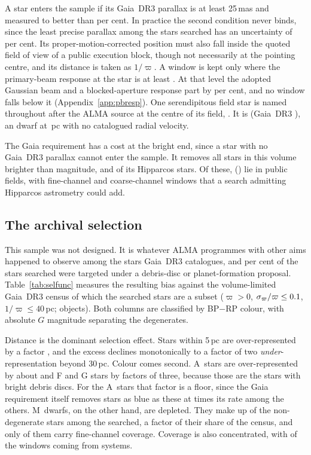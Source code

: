 A star enters the sample if its Gaia~DR3 parallax is at least 25\,mas and
measured to better than \PlxAdqlPct{} per cent. In practice the second
condition never binds, since the least precise parallax among the stars
searched has an uncertainty of \SfPlxWorstPct{} per cent.
Its proper-motion-corrected position must also fall inside the quoted field
of view of a public execution block, though not necessarily at the pointing
centre, and its distance is taken as $1/\varpi$. A window is kept only where
the primary-beam response at the star is at least \BmFloorResp. At that level
the adopted Gaussian beam and a blocked-aperture response part by
\BmFloorTolPct{} per cent, and no window falls below it
(Appendix~\ref{app:pbresp}). One serendipitous field star is named throughout
after the ALMA source at the centre of its field, \BkAlmaName. It is
\BkAlmaTwoMass{} (Gaia~DR3 \BkAlmaGaia), an \BkAlmaSpType{} dwarf at
\BkAlmaDistPc\,pc with no catalogued radial velocity.

The Gaia requirement has a cost at the bright end, since a star with no
Gaia~DR3 parallax cannot enter the sample. It removes all \BsNBright{} stars
in this volume brighter than \BsBrightMag{} magnitude, and \BsNGap{} of its
\BsNVol{} Hipparcos stars. Of these, \BsNAlmaWord{} (\BsStarList) lie in
public fields, with \BsNWinA{} fine-channel and \BsNWinB{} coarse-channel
windows that a search admitting Hipparcos astrometry could add.


\subsection{The archival selection}
\label{sec:bias}

This sample was not designed. It is whatever ALMA programmes with other aims
happened to observe among the stars Gaia~DR3 catalogues, and
\PctDiscProposal{} per cent of the stars searched were targeted under a
debris-disc or planet-formation proposal. Table~\ref{tab:selfunc} measures the
resulting bias against the volume-limited Gaia~DR3 census of which the
searched stars are a subset ($\varpi>0$, $\sigma_\varpi/\varpi\le0.1$,
$1/\varpi\le40$\,pc; \SfCensusN{} objects). Both columns are classified by
BP$-$RP colour, with absolute $G$ magnitude separating the degenerates.

Distance is the dominant selection effect. Stars within 5\,pc are
over-represented by a factor \SfTopRatio, and the excess declines
monotonically to a factor of two \emph{under}-representation beyond 30\,pc. Colour comes
second. A~stars are over-represented by about \SfARatio{} and F and G stars
by factors of three, because those are the stars with bright debris discs.
For the A~stars that factor is a floor, since the Gaia requirement
itself removes stars as blue as these at \BsEarlyRatio{} times its rate among
the others. M~dwarfs, on the other hand, are depleted. They make up
\SfMSearched{} of the \SfNMain{} non-degenerate stars among the \SfNStar{}
searched, a factor \SfMRatio{} of their share of the census, and only
\SfMClassAStars{} of them carry fine-channel coverage. Coverage is also concentrated, with
\ConcThreeWin{} of the \NWindows{} windows coming from \ConcThreeSys{}
systems.

